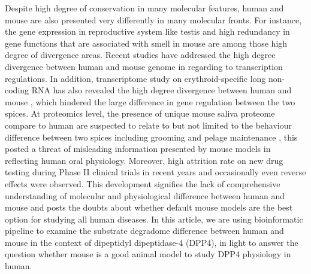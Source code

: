 Despite high degree of conservation in many molecular features, human and mouse are also presented very differently in many molecular fronts. For instance, the gene expression in reproductive system like testis \cite{Chan_2009, Brawand_2011, Necsulea_2014} and high redundancy in gene functions that are associated with smell in mouse \cite{Gilad_2009, Gilad_2003, Young_2002} are among those high degree of divergence areas. Recent studies have addressed the high degree divergence between human and mouse genome in regarding to transcription regulations. \cite{25409824} In addition, transcriptome study on erythroid-specific long non-coding RNA has also revealed the high degree divergence between human and mouse \cite{An_2015}, which hindered the large difference in gene regulation between the two spices. At proteomics level, the presence of unique mouse saliva proteome compare to human are suspected to relate to but not limited to the behaviour difference between two spices including grooming and pelage maintenance \cite{Karn_2013}, this posted a threat of misleading information presented by mouse models in reflecting human oral physiology. Moreover, high attrition rate on new drug testing during Phase II clinical trials in recent years \cite{Arrowsmith_2011} and occasionally even reverse effects were observed. This development signifies the lack of comprehensive understanding of molecular and physiological difference between human and mouse \cite{de_Magalh_es_2014} and posts the doubts about whether default mouse models are the best option for studying all human diseases. In this article, we are using bioinformatic pipeline to examine the substrate degradome difference between human and mouse in the context of dipeptidyl dipeptidase-4 (DPP4), in light to answer the question whether mouse is a good animal model to study DPP4 physiology in human.
\\

